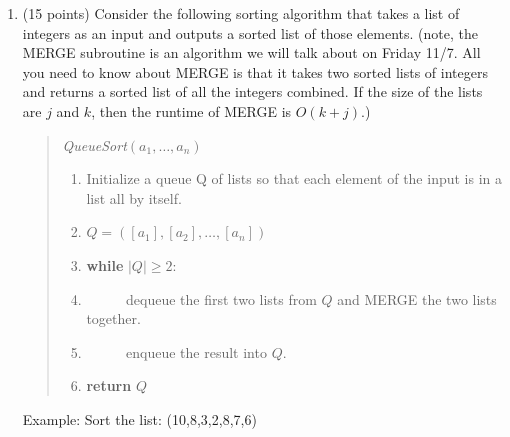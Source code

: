 \documentclass[10pt,letterpaper,unboxed,cm]{article}
\begin{document}
\begin{enumerate}
If $f(v)>0$, then $v>r$.
The algorithm sets $hi=v$, so
\[lo\leq r<v=hi_{\text{new}}.\]

If $f(v)=0$, the algorithm returns
the exact root and terminates.

Therefore, the invariant holds after
iteration $t$, and hence at iteration $t+1$.

\textbf{Conclusion:}

By induction, $lo\leq r\leq hi$
is maintained throughout the algorithm.


\item (15 points)
Consider the following sorting algorithm that takes a list of integers as an input and outputs a sorted list of those elements. (note, the MERGE subroutine is an algorithm we will talk about on Friday 11/7. All you need to know about MERGE is that it takes two sorted lists of integers and returns a sorted list of all the integers combined. If the size of the lists are $j$ and $k$, then the runtime of MERGE is $O(k+j)$.)

\begin{quote}
\emph{QueueSort}$(a_1,\dots,a_n)$
\begin{enumerate}[1.]
\item Initialize a queue Q of lists so that each element of the input is in a list all by itself.
\item $Q = ([a_1],[a_2],\dots,[a_n])$
\item {\bf while} $|Q|\geq 2$:
\item ~~~~~ dequeue the first two lists from $Q$ and MERGE the two lists together.
\item ~~~~~ enqueue the result into $Q$.
\item {\bf return} $Q$
\end{enumerate}
\end{quote}
\newpage

Example: Sort the list: (10,8,3,2,8,7,6)


\end{enumerate}
\end{document}
